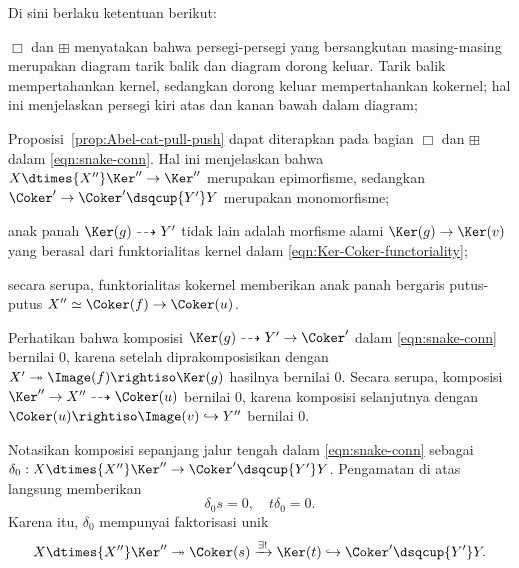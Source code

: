 Di sini berlaku ketentuan berikut:
\begin{compactitem}
	\item $\Box$ dan $\boxplus$ menyatakan bahwa persegi-persegi yang
	bersangkutan masing-masing merupakan diagram tarik balik dan diagram dorong
	keluar. Tarik balik mempertahankan kernel, sedangkan dorong keluar
	mempertahankan kokernel; hal ini menjelaskan persegi kiri atas dan kanan
	bawah dalam diagram;
	\item Proposisi~\ref{prop:Abel-cat-pull-push} dapat diterapkan pada bagian
	$\Box$ dan $\boxplus$ dalam \eqref{eqn:snake-conn}. Hal ini menjelaskan bahwa
	$X \dtimes{X''} \Ker'' \to \Ker''$ merupakan epimorfisme, sedangkan
	$\Coker' \to \Coker' \dsqcup{Y'} Y$ merupakan monomorfisme;
	\item anak panah $\Ker(g) \dashrightarrow Y'$ tidak lain adalah morfisme
	alami $\Ker(g) \to \Ker(v)$ yang berasal dari funktorialitas kernel dalam
	\eqref{eqn:Ker-Coker-functoriality};
	\item secara serupa, funktorialitas kokernel memberikan anak panah bergaris
	putus-putus $X'' \simeq \Coker(f) \to \Coker(u)$.
\end{compactitem}

Perhatikan bahwa komposisi
$\Ker(g) \dashrightarrow Y' \to \Coker'$ dalam \eqref{eqn:snake-conn}
bernilai $0$, karena setelah diprakomposisikan dengan
$X' \twoheadrightarrow \Image(f) \rightiso \Ker(g)$ hasilnya bernilai $0$.
Secara serupa, komposisi
$\Ker'' \to X'' \dashrightarrow \Coker(u)$ bernilai $0$, karena komposisi
selanjutnya dengan $\Coker(u) \rightiso \Image(v) \hookrightarrow Y''$
bernilai $0$.

Notasikan komposisi sepanjang jalur tengah dalam \eqref{eqn:snake-conn} sebagai
$\delta_0: X \dtimes{X''} \Ker'' \to \Coker' \dsqcup{Y'} Y$. Pengamatan di
atas langsung memberikan
\[ \delta_0 s = 0, \quad t \delta_0 = 0. \]
Karena itu, $\delta_0$ mempunyai faktorisasi unik
\[ X \dtimes{X''} \Ker'' \twoheadrightarrow \Coker(s) \xrightarrow{\exists!} \Ker(t) \hookrightarrow \Coker' \dsqcup{Y'} Y . \]

